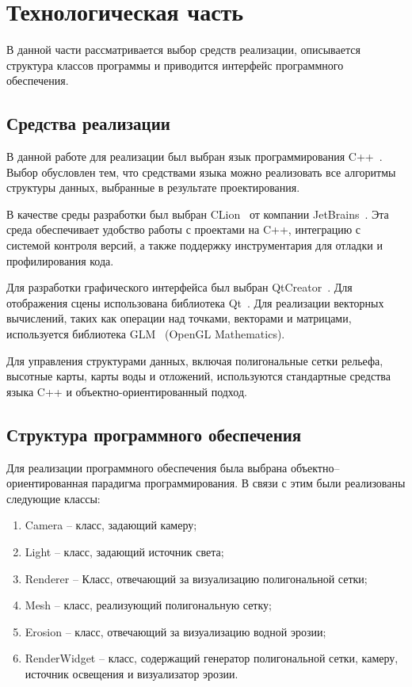 \chapter{Технологическая часть}

В данной части рассматривается выбор средств реализации, описывается структура классов программы и
приводится интерфейс программного обеспечения.


\section{Средства реализации}

В данной работе для реализации был выбран язык программирования C++~\cite{cpp}.
Выбор обусловлен тем, что средствами языка можно реализовать все алгоритмы структуры данных, выбранные в результате проектирования.

В качестве среды разработки был выбран CLion~\cite{clion} от компании JetBrains~\cite{jet}.
Эта среда обеспечивает удобство работы с проектами на C++, интеграцию с системой контроля версий, а также поддержку
инструментария для отладки и профилирования кода.

Для разработки графического интерфейса был выбран QtCreator~\cite{qtCreator}.
Для отображения сцены использована библиотека Qt~\cite{qt}. Для реализации векторных вычислений,
таких как операции над точками, векторами и матрицами, используется библиотека GLM~\cite{glm} (OpenGL Mathematics).

Для управления структурами данных, включая полигональные сетки рельефа, высотные карты, карты воды и отложений,
используются стандартные средства языка C++ и объектно-ориентированный подход.

\section{Структура программного обеспечения}

Для реализации программного обеспечения была выбрана объектно–ориентированная
парадигма программирования. В связи с этим были реализованы следующие классы:

\begin{enumerate}
    \item Camera -- класс, задающий камеру;
    \item Light -- класс, задающий источник света;
    \item Renderer -- Класс, отвечающий за визуализацию полигональной сетки;
    \item Mesh -- класс, реализующий полигональную сетку;
    \item Erosion -- класс, отвечающий за визуализацию водной эрозии;
    \item RenderWidget -- класс, содержащий генератор полигональной сетки, камеру, источник освещения и визуализатор эрозии.
\end{enumerate}

